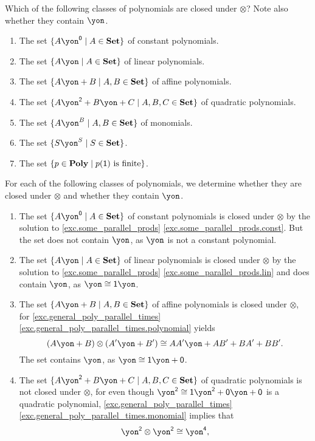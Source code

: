 \documentclass[Book-Poly]{subfiles}
\begin{document}
\begin{exercise}\label{exc.dir_closed_classes}
Which of the following classes of polynomials are closed under $\otimes$? Note also whether they contain $\yon$.
\begin{enumerate}
	\item The set $\{A\yon^\0\mid A\in\smset\}$ of constant polynomials.
	\item The set $\{A\yon\mid A\in\smset\}$ of linear polynomials.
	\item The set $\{A\yon+B\mid A,B\in\smset\}$ of affine polynomials.
	\item The set $\{A\yon^\2+B\yon+C\mid A,B,C\in\smset\}$ of quadratic polynomials.
	\item The set $\{A\yon^B\mid A,B\in\smset\}$ of monomials.
	\item The set $\{S\yon^S\mid S\in\smset\}$.
	\item The set $\{p\in\mathbf{Poly}\mid p(\textsf{1})\text{ is finite}\}$. \qedhere
\end{enumerate}
\begin{solution}
For each of the following classes of polynomials, we determine whether they are closed under $\otimes$ and whether they contain $\yon$.
\begin{enumerate}
	\item The set $\{A\yon^\0\mid A\in\smset\}$ of constant polynomials is closed under $\otimes$ by the solution to \cref{exc.some_parallel_prods} \cref{exc.some_parallel_prods.const}.
	But the set does not contain $\yon$, as $\yon$ is not a constant polynomial.
	\item The set $\{A\yon\mid A\in\smset\}$ of linear polynomials is closed under $\otimes$ by the solution to \cref{exc.some_parallel_prods} \cref{exc.some_parallel_prods.lin} and does contain $\yon$, as $\yon \iso \1\yon$.
	\item The set $\{A\yon+B\mid A,B\in\smset\}$ of affine polynomials is closed under $\otimes$, for \cref{exc.general_poly_parallel_times} \cref{exc.general_poly_parallel_times.polynomial} yields
	\[
	    (A\yon + B) \otimes (A'\yon + B') \iso AA'\yon + AB' + BA' + BB'.
	\]
	The set contains $\yon$, as $\yon \iso \1\yon + \0 $.
	\item The set $\{A\yon^\2+B\yon+C\mid A,B,C\in\smset\}$ of quadratic polynomials is not closed under $\otimes$, for even though $\yon^\2 \iso \1\yon^\2 + \0\yon + \0$ is a quadratic polynomial, \cref{exc.general_poly_parallel_times} \cref{exc.general_poly_parallel_times.monomial} implies that
	\[
	    \yon^\2 \otimes \yon^\2 \iso \yon^\4,
\]
\end{enumerate}
\end{solution}
\end{exercise}
\end{document}
